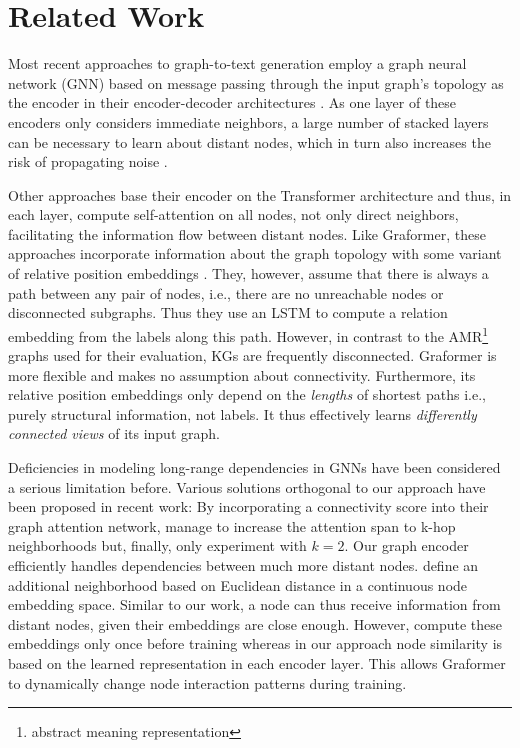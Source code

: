 \documentclass[11pt]{article}
\begin{document}
\section{Related Work}

Most recent approaches to graph-to-text generation
employ a graph neural network (GNN) based on message passing through the input graph's topology
as the encoder in their encoder-decoder architectures \citep{marcheggiani-perez-beltrachini-2018-deep,koncel-kedziorski-etal-2019-text,ribeiro-etal-2019-enhancing,guo-etal-2019-densely}.
As one layer of these encoders only considers immediate neighbors,
a large number of stacked layers can be necessary to learn about distant nodes,
which in turn also increases the risk of propagating noise \citep{li18}.

Other approaches \citep{zhu-etal-2019-modeling,cai20} base their encoder on the Transformer architecture \citep{vaswani17}
and thus, in each layer, compute self-attention on all nodes, not only direct neighbors,
facilitating the information flow between distant nodes.
Like Graformer, these approaches incorporate information about the graph topology with some variant of relative position embeddings \citep{shaw-etal-2018-self}.
They, however, assume that there is always a path between any pair of nodes, i.e., there are no unreachable nodes or disconnected subgraphs.
Thus they use an LSTM \citep{lstm} to compute a relation embedding from the
labels along this path.
However, in contrast to the AMR\footnote{abstract meaning representation} graphs used for their evaluation,
KGs are frequently disconnected.
Graformer is more flexible and makes no assumption about connectivity.
Furthermore, its relative position embeddings only depend on the \textit{lengths} of shortest paths
i.e., purely structural information, not labels.
It thus effectively learns \textit{differently connected views} of its input graph.

Deficiencies in modeling long-range dependencies in GNNs
have been considered a serious limitation before.
Various solutions orthogonal to our approach have been proposed in recent work:
By incorporating a connectivity score into their graph attention network,
\citet{zhang20} manage to increase the attention span to k-hop neighborhoods
but, finally, only experiment with $k=2$.
Our graph encoder efficiently handles dependencies between much more distant nodes.
\citet{pei20} define an additional neighborhood
based on Euclidean distance in a continuous node embedding space.
Similar to our work,
a node can thus receive information from distant nodes,
given their embeddings are close enough.
However, \citet{pei20} compute these embeddings only once before training
whereas in our approach
node similarity is based on the learned representation in each encoder layer.
This allows Graformer to dynamically change node interaction patterns during training.
\end{document}
